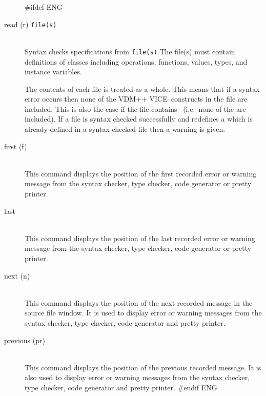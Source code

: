 \documentclass[\pformat,12pt]{article}
\newcommand{\vdmslpp}{VDM-SL}
\newcommand{\vdmslpp}{VDM++}
\renewcommand{\vdmslpp}{VDM++ VICE}
\begin{document}
\begin{description}
#ifdef ENG
\item[read (r) {\tt file(s)}] \mbox{}\\
  Syntax checks specifications from {\tt file(s)}
    {The file(s) must contain definitions of classes
    including operations, functions, values, types, and instance
    variables.}

  The contents of each file is treated as a whole.  This means that
  if a syntax error occurs then none of the \vdmslpp\ constructs in
  the file are included.  This is also the case if the file contains
  ~(i.e.~none of the
   are included).  If a
  file is syntax checked successfully and redefines a 
   which
  is already defined in a syntax checked file then a warning is
  given.

\item[first (f)] \mbox{}\\
  This command displays the position of the first recorded error or
  warning message from the syntax checker, type checker, code
  generator or pretty printer.

\item[last] \mbox{}\\
  This command displays the position of the last recorded error or
  warning message from the syntax checker, type checker, code
  generator or pretty printer.

\item[next (n) \index{next command}]\mbox{}\\
  This command displays the position of the next recorded message in
  the source file window.  It is used to display error or warning
  messages from the syntax checker, type checker, code generator and
  pretty printer.

\item[previous (pr)] \mbox{}\\
  This command displays the position of the previous recorded message.
  It is also used to display error or warning messages from the syntax
  checker, type checker, code generator and pretty printer.
#endif ENG


\end{description}
\end{document}

